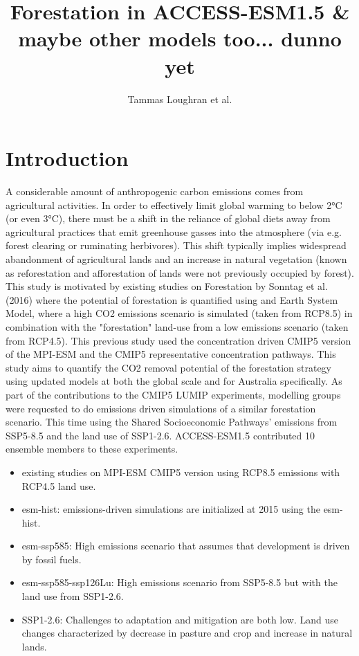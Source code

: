 \documentclass[]{article}
\title{Forestation in ACCESS-ESM1.5 \& maybe other models too... dunno yet}
\author{Tammas Loughran et al.}
\begin{document}
\maketitle

\section{Introduction}

A considerable amount of anthropogenic carbon emissions comes from agricultural activities.
In order to effectively limit global warming to below 2°C (or even 3°C), there must be a shift in the reliance of global diets away from agricultural practices that emit greenhouse gasses into the atmosphere (via e.g. forest clearing or ruminating herbivores).
This shift typically implies widespread abandonment of agricultural lands and an increase in natural vegetation (known as reforestation and afforestation of lands were not previously occupied by forest).
This study is motivated by existing studies on Forestation by Sonntag et al. (2016) where the potential of forestation is quantified using and Earth System Model, where a high CO2 emissions scenario is simulated (taken from RCP8.5) in combination with the "forestation" land-use from a low emissions scenario (taken from RCP4.5).
This previous study used the concentration driven CMIP5 version of the MPI-ESM and the CMIP5 representative concentration pathways.
This study aims to quantify the CO2 removal potential of the forestation strategy using updated models at both the global scale and for Australia specifically.
As part of the contributions to the CMIP5 LUMIP experiments, modelling groups were requested to do emissions driven simulations of a similar forestation scenario.
This time using the Shared Socioeconomic Pathways' emissions from SSP5-8.5 and the land use of SSP1-2.6.
ACCESS-ESM1.5 contributed 10 ensemble members to these experiments.

\begin{itemize}
    \item existing studies on MPI-ESM CMIP5 version using RCP8.5 emissions with RCP4.5 land use. \cite{sonntag_reforestation_2016} \cite{sonntag_quantifying_2018}
    \item esm-hist: emissions-driven simulations are initialized at 2015 using the esm-hist. \cite{eyring_overview_2016}
    \item esm-ssp585: High emissions scenario that assumes that development is driven by fossil fuels. \cite{oneill_scenario_2016}
    \item esm-ssp585-ssp126Lu: High emissions scenario from SSP5-8.5 but with the land use from SSP1-2.6. \cite{lawrence_land_2016}
    \item SSP1-2.6: Challenges to adaptation and mitigation are both low. Land use changes characterized by decrease in pasture and crop and increase in natural lands. \cite{van_vuuren_energy_2017}
\end{itemize}
\end{document}
